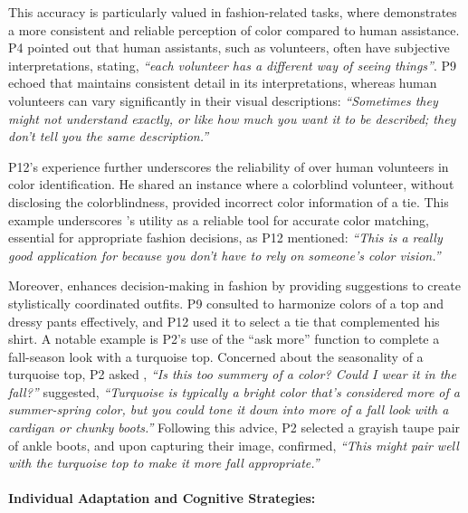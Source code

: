 This accuracy is particularly valued in fashion-related tasks, where \bma{} demonstrates a more consistent and reliable perception of color compared to human assistance. 
P4 pointed out that human assistants, such as \bme{} volunteers, often have subjective interpretations, stating, \textit{``each volunteer has a different way of seeing things''}. 
% 
P9 echoed that \bma{} maintains consistent detail in its interpretations, whereas human volunteers can vary significantly in their visual descriptions: \textit{``Sometimes they might not understand exactly, or like how much you want it to be described; they don't tell you the same description.''}



P12's experience further underscores the reliability of \bma{} over human volunteers in color identification. He shared an instance where a colorblind volunteer, without disclosing the colorblindness, provided incorrect color information of a tie. 
This example underscores \bma's utility as a reliable tool for accurate color matching, essential for appropriate fashion decisions, as P12 mentioned: \textit{``This is a really good application for \bma{} because you don't have to rely on someone's color vision.''}




Moreover, \bma{} enhances decision-making in fashion by providing suggestions to create stylistically coordinated outfits. P9 consulted \bma{} to harmonize colors of a top and dressy pants effectively, and P12 used it to select a tie that complemented his shirt. 
% 
A notable example is P2's use of the ``ask more'' function to complete a fall-season look with a turquoise top.  
Concerned about the seasonality of a turquoise top, P2 asked \bma, \textit{``Is this too summery of a color? Could I wear it in the fall?''} \bma{} suggested, \textit{``Turquoise is typically a bright color that's considered more of a summer-spring color, but you could tone it down into more of a fall look with a cardigan or chunky boots.''} Following this advice, P2 selected a grayish taupe pair of ankle boots, and upon capturing their image, \bma{} confirmed, \textit{``This might pair well with the turquoise top to make it more fall appropriate.''}







\paragraph{Individual Adaptation and Cognitive Strategies:}

